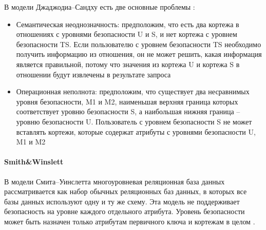 В модели Джаджодиа–Сандху есть две основные проблемы \autocite{Osama}:
\begin{itemize}
    \item Семантическая неоднозначность: предположим, что есть два кортежа в отношениях с уровнями безопасности 
    U и S, и нет кортежа с уровнем безопасности TS. Если пользователю с уровнем безопасности TS необходимо 
    получить информацию из отношения, он не может решить, какая информация является правильной, потому что 
    значения из кортежа U и кортежа S в отношении будут извлечены в результате запроса
    \item Операционная неполнота: предположим, что существует два несравнимых уровня безопасности, M1 и M2, 
    наименьшая верхняя граница которых соответствует уровню безопасности S, а наибольшая нижняя граница -- 
    уровню безопасности U. Пользователь с уровнем безопасности S не может вставлять кортежи, которые содержат 
    атрибуты с уровнями безопасности U, M1 и M2
\end{itemize}

\paragraph{Smith\&Winslett}

В модели Смита–Уинслетта многоуровневая реляционная база данных рассматривается как набор обычных реляционных 
баз данных, в которых все базы данных используют одну и ту же схему. Эта модель не поддерживает безопасность 
на уровне каждого отдельного атрибута. Уровень безопасности может быть назначен только атрибутам первичного 
ключа и кортежам в целом \autocite{Osama}.

